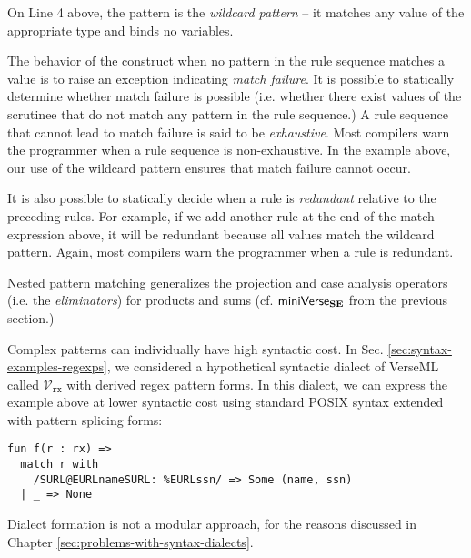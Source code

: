 On Line 4 above, the pattern \li{_} is the \emph{wildcard pattern} -- it matches any value of the appropriate type and binds no variables.

The behavior of the  construct when no pattern in the rule sequence matches a value is to raise an exception indicating \emph{match failure}. It is possible to statically determine whether match failure is possible (i.e. whether there exist values of the scrutinee that do not match any pattern in the rule sequence.) A rule sequence that cannot lead to match failure is said to be \emph{exhaustive}. Most compilers warn the programmer when a rule sequence is non-exhaustive. In the example above, our use of the wildcard pattern ensures that match failure cannot occur. 

It is also possible to statically decide when a rule is \emph{redundant} relative to the preceding rules. For example, if we add  another rule at the end of the match expression above, it will be redundant because all values match the wildcard pattern. Again, most compilers warn the programmer when a rule is redundant.

Nested pattern matching generalizes the projection and case analysis operators (i.e. the \emph{eliminators}) for products and sums (cf. $\mathsf{miniVerse}_\textbf{SE}$ from the previous section.) 

Complex patterns can individually have high syntactic cost. In Sec. \ref{sec:syntax-examples-regexps}, we considered a hypothetical syntactic dialect of VerseML called $\mathcal{V}_\texttt{rx}$ with derived regex pattern forms. In this dialect, we can express the example above at lower syntactic cost using standard POSIX syntax extended with pattern splicing forms:

\begin{lstlisting}
fun f(r : rx) => 
  match r with 
    /SURL@EURLnameSURL: %EURLssn/ => Some (name, ssn)
  | _ => None\end{lstlisting}
\noindent
Dialect formation is not a modular approach, for the reasons discussed in Chapter \ref{sec:problems-with-syntax-dialects}.



